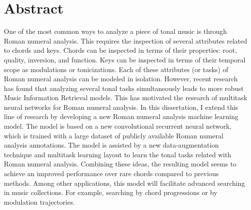\chapter*{Abstract}
\label{chap:abstract-en}

One of the most common ways to analyze a piece of tonal
music is through Roman numeral analysis. This requires the
inspection of several attributes related to chords and keys.
Chords can be inspected in terms of their properties: root,
quality, inversion, and function. Keys can be inspected in
terms of their temporal scope as modulations or
tonicizations. Each of these attributes (or tasks) of Roman
numeral analysis can be modeled in isolation. However,
recent research has found that analyzing several tonal tasks
simultaneously leads to more robust Music Information
Retrieval models. This has motivated the research of
multitask neural networks for Roman numeral analysis.
In this dissertation, I extend this line of research by
developing a new Roman numeral analysis machine learning
model. The model is based on a new convolutional recurrent
neural network, which is trained with a large dataset of
publicly available Roman numeral analysis annotations. The
model is assisted by a new data-augmentation technique and
multitask learning layout to learn the tonal tasks related
with Roman numeral analysis. Combining these ideas, the
resulting model seems to achieve an improved performance
over rare chords compared to previous methods. Among other
applications, this model will facilitate advanced searching
in music collections. For example, searching by chord
progressions or by modulation trajectories.
